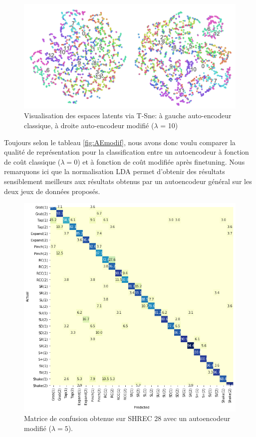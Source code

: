 \begin{figure}[H]
    \centering
    \includegraphics[width=0.8\linewidth]{Images/tsne_results.png}
    \caption{Visualisation des espaces latents via T-Sne: à gauche auto-encodeur classique, à droite auto-encodeur modifié ($\lambda$ = 10)}
    \label{fig:AEmodifTSNE}
\end{figure}

Toujours selon le tableau \ref{fig:AEmodif}, nous avons donc voulu comparer la qualité de représentation pour la classification entre un autoencodeur à fonction de coût classique ($\lambda = 0$) et à fonction de coût modifiée après finetuning. Nous remarquons ici que la normalisation LDA permet d'obtenir des résultats sensiblement meilleurs aux résultats obtenus par un autoencodeur général sur les deux jeux de données proposés.

\begin{figure}[H]
    \centering
    \includegraphics[width=0.8\linewidth]{Images/shrec28.png}
    \caption{Matrice de confusion obtenue sur SHREC 28 avec un autoencodeur modifié ($\lambda = 5$).}
    \label{fig:rsshrec28}
\end{figure}\textbf{}

